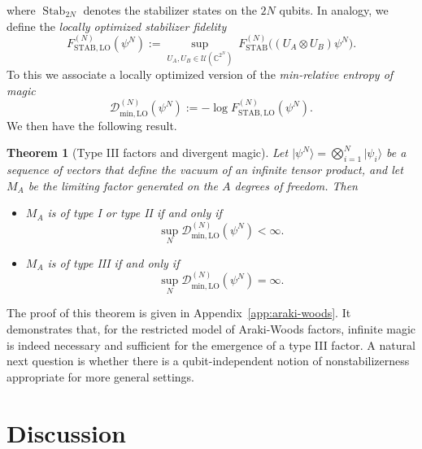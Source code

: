 \documentclass[aps,pra,reprint,superscriptaddress]{revtex4-2}
\newcommand{\bbC}{\mathbb C}
\newcommand{\cD}{{\mathcal D}}
\newcommand{\cU}{{\mathcal U}}
\providecommand{\ket}[1]{\lvert #1\rangle}
\newcommand{\Stab}{\operatorname{Stab}}
\newtheorem{theorem}{Theorem}
\theoremstyle{definition}
\theoremstyle{remark}
\begin{document}
where $\Stab_{2N}$ denotes
the stabilizer states on the $2N$ qubits.
In analogy, we define the \emph{locally optimized stabilizer fidelity}
\begin{equation}\label{eq:locally_optimized_stabilizer_fidelity}
    F_{\mathrm{STAB},\mathrm{LO}}^{(N)}(\psi^N)
 := \sup_{U_A,U_B\in\cU(\bbC^{2^N})}\ F_{\mathrm{STAB}}^{(N)}\big( (U_A\otimes U_B) \psi^N \big) .
\end{equation}
To this we associate a locally optimized version of the \emph{min-relative entropy of magic} \cite{Liu:2020yso}
\begin{equation}\label{eq:locally_optimized_min_relative_entropy}
    \cD_{\mathrm{min},\mathrm{LO}}^{(N)}(\psi^N)
 :=-\log F_{\mathrm{STAB},\mathrm{LO}}^{(N)}(\psi^N).
\end{equation}
We then have the following result.

\begin{theorem}[Type III factors and divergent magic]\label{thm:aw_magic}
Let $\ket{\psi^N}=\bigotimes_{i=1}^{N}\ket{\psi_i}$ be a sequence of vectors
that define the vacuum of an infinite tensor product, 
and let $M_A$ be the limiting factor
generated on the $A$ degrees of freedom.  Then
\begin{itemize}
 \item $M_A$ is of type I or type II if and only if
 \begin{equation}
     \sup_{N}\cD_{\mathrm{min},\mathrm{LO}}^{(N)}(\psi^N)<\infty.
 \end{equation}
 \item $M_A$ is of type III if and only if
\begin{equation}
    \sup_{N}\cD_{\mathrm{min},\mathrm{LO}}^{(N)}(\psi^N)=\infty.
\end{equation}
\end{itemize}
\end{theorem}

The proof of this theorem is given in Appendix~\ref{app:araki-woods}.  It demonstrates that,
for the restricted model of Araki-Woods factors, infinite magic is indeed
necessary and sufficient for the emergence of a type III factor. 
A natural next question is whether there is a qubit-independent notion
of nonstabilizerness appropriate for more general settings.

\section{Discussion} \label{sec:discussion}
\end{document}
